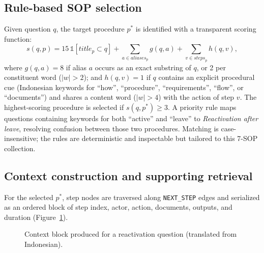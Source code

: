 \documentclass[preprint,10pt]{elsarticle}
\begin{document}
\subsection{Rule-based SOP selection}
Given question $q$, the target procedure $p^\ast$ is identified with a transparent scoring function:
\begin{equation}
s(q,p) = 15\,\mathbb{1}[\textit{title}_p \subset q] + \sum_{a \in \textit{aliases}_p} g(q,a) + \sum_{v \in \textit{steps}_p} h(q,v),
\label{eq:score}
\end{equation}
where $g(q,a)=8$ if alias $a$ occurs as an exact substring of $q$, or 2 per constituent word ($|w|>2$); and $h(q,v)=1$ if $q$ contains an explicit procedural cue (Indonesian keywords for ``how'', ``procedure'', ``requirements'', ``flow'', or ``documents'') and shares a content word ($|w|>4$) with the action of step $v$. The highest-scoring procedure is selected if $s(q,p^\ast)\geq 3$. A priority rule maps questions containing keywords for both ``active'' and ``leave'' to \emph{Reactivation after leave}, resolving confusion between those two procedures. Matching is case-insensitive; the rules are deterministic and inspectable but tailored to this 7-SOP collection.

\subsection{Context construction and supporting retrieval}
For the selected $p^\ast$, step nodes are traversed along \texttt{NEXT\_STEP} edges and serialized as an ordered block of step index, actor, action, documents, outputs, and duration (Figure~\ref{fig:context}).

\begin{figure}[!htbp]
\centering
\small
{}
\caption{Context block produced for a reactivation question (translated from Indonesian).}
\label{fig:context}
\end{figure}
\end{document}
